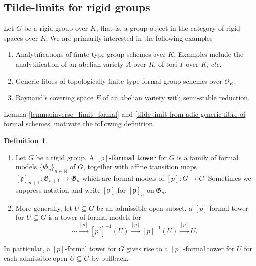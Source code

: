\documentclass[10pt,oneside]{amsart}
\theoremstyle{definition}
\newtheorem{definition}[theorem]{Definition}
\begin{document}
	
\subsection{Tilde-limits for rigid groups}

Let $G$ be a rigid group over $K$, that is, a group object in the category of rigid spaces over $K$.
	We are primarily interested in the following examples 
\begin{enumerate}	 
\item Analytifications of finite type group schemes over $K$. Examples include the analytification of an abelian variety $A$ over $K$, of tori $T$ over $K$, \textit{\small etc.}
\item Generic fibres of topologically finite type formal group schemes over $\mathcal O_K$. 
\item Raynaud's covering space $E$  of an abelian variety with semi-stable reduction.
\end{enumerate}

	Lemma \ref{lemma:inverse_limit_formal} and  \ref{tilde-limit from adic generic fibre of formal schemes} motivate the following definition. 
	\begin{definition}  \indent 
	
	\begin{enumerate}
	\item	Let $G$ be a rigid group. A \textbf{$[p]$-formal tower} for $G$ is  a family of formal models $\{\mathfrak G_n\}_{n\in \mathbb N}$ of $G$, together with affine transition maps $[\mathfrak p]_{n+1}:\mathfrak G_{n+1}\rightarrow \mathfrak G_{n}$ which are formal models of $[p]:G\rightarrow G$. Sometimes we suppress notation and write $[\mathfrak p]$ for $[\mathfrak p]_{n}$ on $\mathfrak G_n$. 
	\item	 More generally, let $U\subseteq G$ be an admissible open subset, a $[p]$-formal tower for $U \subseteq G$ is a tower of formal models for 
$$ \cdots \xrightarrow{[p]} [p^2]^{-1} (U)   \xrightarrow{[p]} [p]^{-1} (U)  \xrightarrow{[p]} U. $$  
	\end{enumerate}
	\end{definition}
	

In particular, a $[p]$-formal tower for $G$ gives rise to a $[p]$-formal tower for $U$ for each admissible open $U \subseteq G$ by pullback. 

\begin{comment}	\begin{center}
		\begin{tikzcd}
			\dots \arrow[r] & \left [p^2\right]^{-1}(U) \arrow[r, "{[p]}"] \arrow[d, hook'] & \left [p\right]^{-1}(U) \arrow[r, "{[p]}"] \arrow[d, hook'] & U \arrow[d, hook'] \\
			\dots \arrow[r, "{[p]}"] & G \arrow[r, "{[p]}"] & G \arrow[r, "{[p]}"] & G
		\end{tikzcd}
	\end{center}  \end{comment}
	
\end{document}
